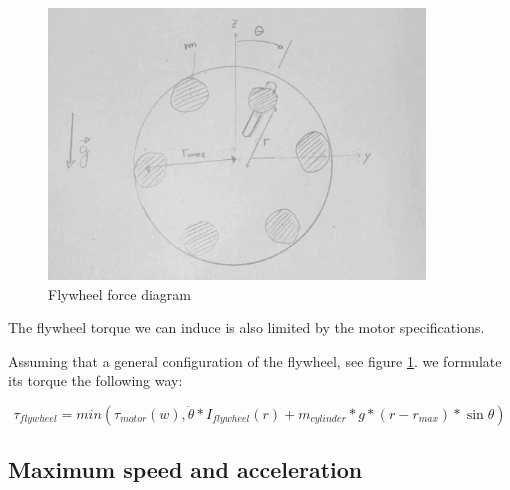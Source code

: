 \begin{figure}
	\centering
	\includegraphics[width=10cm]{img/flywheel_diagram.jpg}
	\caption{Flywheel force diagram}
	\label{fig:Flywheel force diagram}
\end{figure}

The flywheel torque we can induce is also limited by the motor specifications. 

Assuming that a general configuration of the flywheel, see figure \ref{fig:Flywheel force diagram}. we formulate its torque the following way:

\begin{equation}\label{flywheel equation}
    \tau_{flywheel} = min(\tau_{motor} (w), \ddot{\theta}*I_{flywheel}(r) + m_{cylinder} * g * (r - r_{max}) * \sin{\theta})  
\end{equation}

\subsection{Maximum speed and acceleration}
